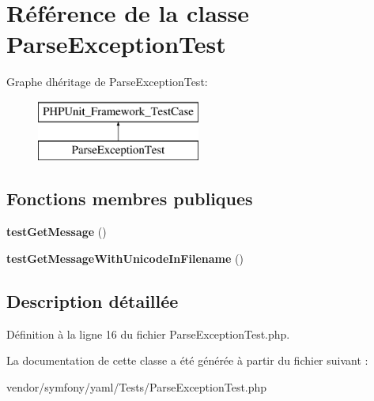 \hypertarget{class_symfony_1_1_component_1_1_yaml_1_1_tests_1_1_parse_exception_test}{}\section{Référence de la classe Parse\+Exception\+Test}
\label{class_symfony_1_1_component_1_1_yaml_1_1_tests_1_1_parse_exception_test}
Graphe d\textquotesingle{}héritage de Parse\+Exception\+Test\+:\begin{figure}[H]
\begin{center}
\leavevmode
\includegraphics[height=2.000000cm]{class_symfony_1_1_component_1_1_yaml_1_1_tests_1_1_parse_exception_test}
\end{center}
\end{figure}
\subsection*{Fonctions membres publiques}
\begin{DoxyCompactItemize}
\item 
{\bfseries test\+Get\+Message} ()\hypertarget{class_symfony_1_1_component_1_1_yaml_1_1_tests_1_1_parse_exception_test_a5451f391f98f4f595d278bee61e96db3}{}\label{class_symfony_1_1_component_1_1_yaml_1_1_tests_1_1_parse_exception_test_a5451f391f98f4f595d278bee61e96db3}

\item 
{\bfseries test\+Get\+Message\+With\+Unicode\+In\+Filename} ()\hypertarget{class_symfony_1_1_component_1_1_yaml_1_1_tests_1_1_parse_exception_test_a45a550db228607903bb8017e1d88eb91}{}\label{class_symfony_1_1_component_1_1_yaml_1_1_tests_1_1_parse_exception_test_a45a550db228607903bb8017e1d88eb91}

\end{DoxyCompactItemize}


\subsection{Description détaillée}


Définition à la ligne 16 du fichier Parse\+Exception\+Test.\+php.



La documentation de cette classe a été générée à partir du fichier suivant \+:\begin{DoxyCompactItemize}
\item 
vendor/symfony/yaml/\+Tests/Parse\+Exception\+Test.\+php\end{DoxyCompactItemize}
